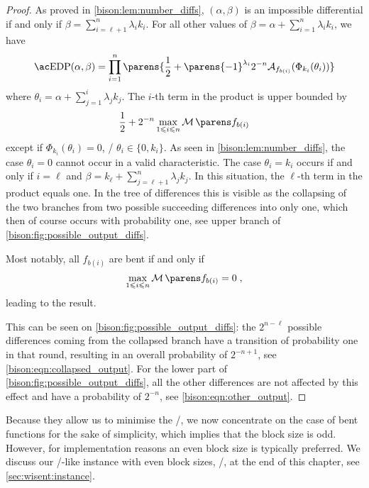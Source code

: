 \begin{proof}
    As proved in \cref{bison:lem:number_diffs}, $(\alpha, \beta)$ is an impossible differential if and only if $\beta = \sum_{i=\ell + 1}^n \lambda_i k_i$.
    For all other values of $\beta = \alpha + \sum_{i=1}^n \lambda_i k_i$, we have
    \begin{equation*}
        \mathrm{\EDP/}(\alpha, \beta) = \prod_{i=1}^n \parens{\frac{1}{2} + \parens{-1}^{\lambda_i} 2^{-n} \AC{f_{b(i)}}(\Phi_{k_i}(\theta_i))}
    \end{equation*}
    where $\theta_i = \alpha + \sum_{j=1}^i \lambda_j k_j$.
    The $i$-th term in the product is upper bounded by
    \begin{equation*}
        \frac{1}{2} + 2^{-n} \max_{1 \leqslant i \leqslant n} \absoluteindicator{f_{b(i)}}
    \end{equation*}
    except if $\Phi_{k_i}(\theta_i) =0$, \ie/ $\theta_i \in \{0, k_i\}$.
    As seen in \cref{bison:lem:number_diffs}, the case $\theta_i=0$ cannot occur in a valid characteristic.
    The case $\theta_i=k_i$ occurs if and only if $i=\ell$ and $\beta = k_\ell + \sum_{j=\ell + 1}^n \lambda_j k_j$.
    In this situation, the $\ell$-th term in the product equals one.
    In the tree of differences this is visible as the collapsing of the two branches from two possible succeeding differences into only one, which then of course occurs with probability one, see upper branch of \cref{bison:fig:possible_output_diffs}.

    Most notably, all $f_{b(i)}$ are bent if and only if
    \begin{equation*}
        \max_{1 \leqslant i \leqslant n} \absoluteindicator{f_{b(i)}} = 0\;,
    \end{equation*}
    leading to the result.

    This can be seen on \cref{bison:fig:possible_output_diffs}: the $2^{n-\ell}$ possible differences coming from the collapsed branch have a transition of probability one in that round, resulting in an overall probability of $2^{-n+1}$, see \cref{bison:eqn:collapsed_output}.
    For the lower part of \cref{bison:fig:possible_output_diffs}, all the other differences are not affected by this effect and have a probability of $2^{-n}$, see \cref{bison:eqn:other_output}.
\end{proof}

Because they allow us to minimise the \MEDP/, we now concentrate on the case of bent functions for the sake of simplicity, which implies that the block size is odd.
However, for implementation reasons an even block size is typically preferred.
We discuss our \bison/-like instance with even block sizes, \wisent/, at the end of this chapter, see \cref{sec:wisent:instance}.

